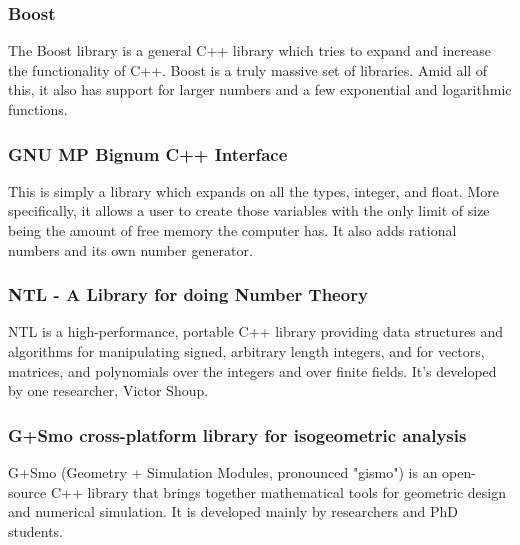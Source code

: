 \documentclass[onecolumn, draftclsnofoot,10pt, compsoc]{IEEEtran}
\begin{document}
\begin{singlespace}
\subsubsection{Boost}
The Boost library is a general C++ library which tries to expand and increase the functionality of C++.
Boost is a truly massive set of libraries.
Amid all of this, it also has support for larger numbers and a few exponential and logarithmic functions.
\cite{Boost}

\subsubsection{GNU MP Bignum C++ Interface}
This is simply a library which expands on all the types, integer, and float.
More specifically, it allows a user to create those variables with the only limit of size being the amount of free memory the computer has.
It also adds rational numbers and its own number generator.
\cite{GNU}

\subsubsection{NTL - A Library for doing Number Theory}
NTL is a high-performance, portable C++ library providing data structures and algorithms for manipulating signed, arbitrary length integers, and for vectors, matrices, and polynomials over the integers and over finite fields.
It's developed by one researcher, Victor Shoup.
\cite{NTL}

\subsubsection{G+Smo cross-platform library for isogeometric analysis}
G+Smo (Geometry + Simulation Modules, pronounced "gismo") is an open-source C++ library that brings together mathematical tools for geometric design and numerical simulation. It is developed mainly by researchers and PhD students.
\cite{GiSmo}


\end{singlespace}
\end{document}
